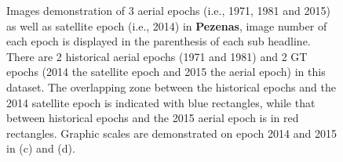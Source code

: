 \begin{figure}[htbp]
\begin{center}
{\begin{minipage}[t]{0.48\linewidth}
    	\end{minipage}%
    }
        \caption{Images demonstration of 3 aerial epochs (i.e., 1971, 1981 and 2015) as well as satellite epoch (i.e., 2014) in \textbf{Pezenas}, image number of each epoch is displayed in the parenthesis of each sub headline. There are 2 historical aerial epochs (1971 and 1981) and 2 \ac{GT} epochs (2014 the satellite epoch and 2015 the aerial epoch) in this dataset. The overlapping zone between the historical epochs and the 2014 satellite epoch is indicated with blue rectangles, while that between historical epochs and the 2015 aerial epoch is in red rectangles. Graphic scales are demonstrated on epoch 2014 and 2015 in (c) and (d).}
        \label{PezenasData}
    \end{center}
\end{figure} 


